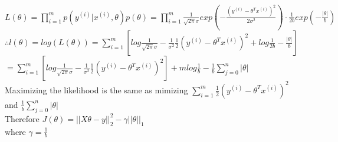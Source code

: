 \begin{answer}\\
$L(\theta)=\prod_{i=1}^{m}p(y^{(i)}|x^{(i)},\theta)p(\theta)=\prod_{i=1}^{m}\frac{1}{\sqrt{2 \pi}\sigma}exp(-\frac{(y^{(i)}-\theta^T x^{(i)})^2}{2 \sigma^2}) \cdot \frac{1}{2b}exp(-\frac{|\theta|}{b})$\\
$\therefore l(\theta)=log(L(\theta))=\sum_{i=1}^{m}\left [ log \frac{1}{\sqrt{2 \pi} \sigma}-\frac{1}{\sigma^2}\frac{1}{2}(y^{(i)}-\theta^T x^{(i)})^2 + log \frac{1}{2b} -\frac{|\theta|}{b} \right]$\\
$=\sum_{i=1}^{m}\left [ log \frac{1}{\sqrt{2 \pi} \sigma}-\frac{1}{\sigma^2}\frac{1}{2}(y^{(i)}-\theta^T x^{(i)})^2 \right ] + m log \frac{1}{b} - \frac{1}{b}\sum_{j=0}^{n}|\theta|$\\
Maximizing the likelihood is the same as mimizing $\sum_{i=1}^{m}\frac{1}{2}(y^{(i)}-\theta^T x^{(i)})^2$ and $\frac{1}{b}\sum_{j=0}^{n}|\theta|$\\
Therefore $J(\theta)=||X\theta-y||_2^2-\gamma||\theta||_1$\\
where $\gamma=\frac{1}{b}$\\
\end{answer}
